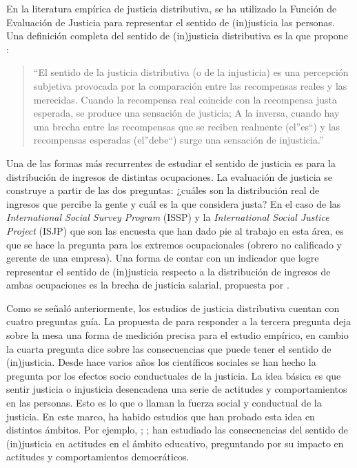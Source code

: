 \documentclass[12pt,twoside]{templates/facsothesis}
\begin{document}
En la literatura empírica de justicia distributiva, se ha utilizado la Función de Evaluación de Justicia para representar el sentido de (in)justicia las personas. Una definición completa del sentido de (in)justicia distributiva es la que propone \citet{Resh2014}:

\begin{quote}
``El sentido de la justicia distributiva (o de la injusticia) es una percepción subjetiva provocada por la comparación entre las recompensas reales y las merecidas. Cuando la recompensa real coincide con la recompensa justa esperada, se produce una sensación de justicia; A la inversa, cuando hay una brecha entre las recompensas que se reciben realmente (el''es``) y las recompensas esperadas (el''debe``) surge una sensación de injusticia.'' \citep[p.53]{Resh2014}
\end{quote}

Una de las formas más recurrentes de estudiar el sentido de justicia es para la distribución de ingresos de distintas ocupaciones. La evaluación de justicia se construye a partir de las dos preguntas: ¿cuáles son la distribución real de ingresos que percibe la gente y cuál es la que considera justa? En el caso de las \emph{International Social Survey Program} (ISSP) y la \emph{International Social Justice Project} (ISJP) que son las encuesta que han dado pie al trabajo en esta área, es que se hace la pregunta para los extremos ocupacionales (obrero no calificado y gerente de una empresa). Una forma de contar con un indicador que logre representar el sentido de (in)justicia respecto a la distribución de ingresos de ambas ocupaciones es la brecha de justicia salarial, propuesta por \citet{Verwiebe2000}.

Como se señaló anteriormente, los estudios de justicia distributiva cuentan con cuatro preguntas guía. La propuesta de \citet{Jasso1980} para responder a la tercera pregunta deja sobre la mesa una forma de medición precisa para el estudio empírico, en cambio la cuarta pregunta dice sobre las consecuencias que puede tener el sentido de (in)justicia. Desde hace varios años los científicos sociales se han hecho la pregunta por los efectos socio conductuales de la justicia. La idea básica es que sentir justicia o injusticia desencadena una serie de actitudes y comportamientos en las personas. Esto es lo que \citet{Jasso2015} o \citet{Liebig2016} llaman la fuerza social y conductual de la justicia. En este marco, ha habido estudios que han probado esta idea en distintos ámbitos. Por ejemplo, \citet{Resh2014}; \citet{Resh2017}; \citet{Resh2018} han estudiado las consecuencias del sentido de (in)justicia en actitudes en el ámbito educativo, preguntando por su impacto en actitudes y comportamientos democráticos.
\end{document}
